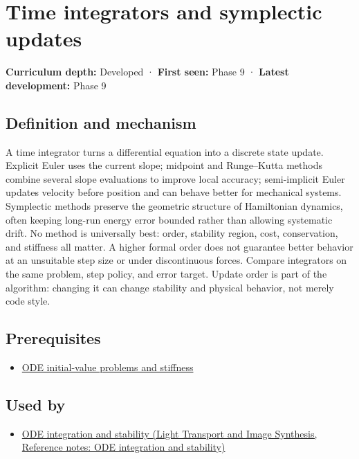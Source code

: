 \hypertarget{appendix-8f96f9c4d5bc}{}\label{referencestart:appendix-8f96f9c4d5bc}
\section{Time integrators and symplectic updates}\label{appendix-8f96f9c4d5bc-time-integrators-and-symplectic-updates}

\textbf{Curriculum depth:} Developed · \textbf{First seen:} Phase 9 · \textbf{Latest development:} Phase 9

\subsection{Definition and mechanism}\label{appendix-8f96f9c4d5bc-definition-and-mechanism}

A time integrator turns a differential equation into a discrete state update. Explicit Euler uses the current slope; midpoint and Runge--Kutta methods combine several slope evaluations to improve local accuracy; semi-implicit Euler updates velocity before position and can behave better for mechanical systems. Symplectic methods preserve the geometric structure of Hamiltonian dynamics, often keeping long-run energy error bounded rather than allowing systematic drift. No method is universally best: order, stability region, cost, conservation, and stiffness all matter. A higher formal order does not guarantee better behavior at an unsuitable step size or under discontinuous forces. Compare integrators on the same problem, step policy, and error target. Update order is part of the algorithm: changing it can change stability and physical behavior, not merely code style.

\subsection{Prerequisites}\label{appendix-8f96f9c4d5bc-prerequisites}

\begin{itemize}
\tightlist
\item
  \hyperref[appendix-e8ab9836882e]{ODE initial-value problems and stiffness}
\end{itemize}

\subsection{Used by}\label{appendix-8f96f9c4d5bc-used-by}

\begin{itemize}
\tightlist
\item
  \href{../04-Light-Transport-and-Image-Synthesis/main.pdf\#nameddest=appendix-18eacf61a04b}{ODE integration and stability (Light Transport and Image Synthesis, Reference notes: ODE integration and stability)}
\end{itemize}


